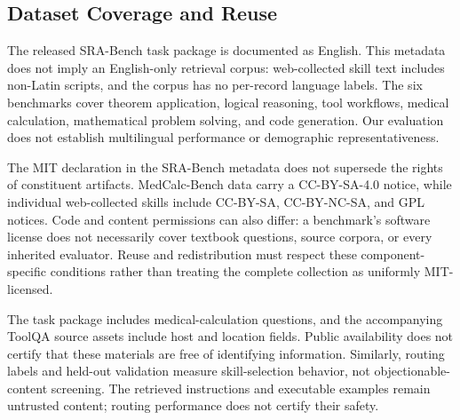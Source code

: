 \subsection{Dataset Coverage and Reuse}
\label{app:artifact-scope}
The released SRA-Bench task package is documented as English. This metadata does not imply an English-only retrieval corpus: web-collected skill text includes non-Latin scripts, and the corpus has no per-record language labels. The six benchmarks cover theorem application, logical reasoning, tool workflows, medical calculation, mathematical problem solving, and code generation. Our evaluation does not establish multilingual performance or demographic representativeness.

The MIT declaration in the SRA-Bench metadata does not supersede the rights of constituent artifacts. MedCalc-Bench data carry a CC-BY-SA-4.0 notice, while individual web-collected skills include CC-BY-SA, CC-BY-NC-SA, and GPL notices. Code and content permissions can also differ: a benchmark's software license does not necessarily cover textbook questions, source corpora, or every inherited evaluator. Reuse and redistribution must respect these component-specific conditions rather than treating the complete collection as uniformly MIT-licensed.

The task package includes medical-calculation questions, and the accompanying ToolQA source assets include host and location fields. Public availability does not certify that these materials are free of identifying information. Similarly, routing labels and held-out validation measure skill-selection behavior, not objectionable-content screening. The retrieved instructions and executable examples remain untrusted content; routing performance does not certify their safety.
